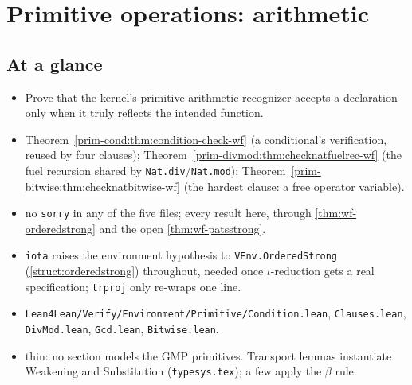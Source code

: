 \chapter{Primitive operations: arithmetic}
\label{chap:primitives-arith}

\section*{At a glance}
\begin{itemize}
\item {} Prove that the kernel's primitive-arithmetic recognizer accepts a declaration
  only when it truly reflects the intended function.
\item {} Theorem~\ref{prim-cond:thm:condition-check-wf} (a conditional's
  verification, reused by four clauses); Theorem~\ref{prim-divmod:thm:checknatfuelrec-wf} (the
  fuel recursion shared by \texttt{Nat.div}/\texttt{Nat.mod}); Theorem~\ref{prim-bitwise:thm:checknatbitwise-wf}
  (the hardest clause: a free operator variable).
\item {} \stProved{} no \texttt{sorry} in any of the five files; \stTainted{} every
  result here, through \ref{thm:wf-orderedstrong} and the open \ref{thm:wf-patsstrong}.
\item {} \texttt{iota} raises the environment hypothesis to
  \texttt{VEnv.OrderedStrong} (\ref{struct:orderedstrong}) throughout, needed once
  $\iota$-reduction gets a real specification; \texttt{trproj} only re-wraps one line.
\item {} \texttt{Lean4Lean/Verify/Environment/Primitive/Condition.lean},
  \texttt{Clauses.lean}, \texttt{DivMod.lean}, \texttt{Gcd.lean}, \texttt{Bitwise.lean}.
\item {} thin: no section models the GMP primitives. Transport lemmas instantiate
  Weakening and Substitution (\texttt{typesys.tex}); a few apply the $\beta$ rule.
\end{itemize}

